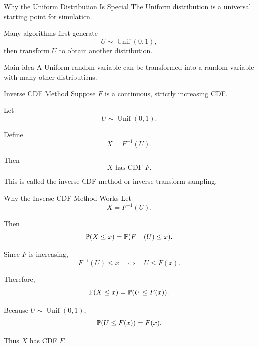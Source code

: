 
\begin{frame}{Why the Uniform Distribution Is Special}
The Uniform distribution is a universal starting point for simulation.

\vspace{0.25cm}

Many algorithms first generate
\[
U\sim \operatorname{Unif}(0,1),
\]
then transform $U$ to obtain another distribution.

\vspace{0.25cm}

\begin{keybox}{Main idea}
A Uniform random variable can be transformed into a random variable with many other distributions.
\end{keybox}
\end{frame}

\begin{frame}{Inverse CDF Method}
Suppose $F$ is a continuous, strictly increasing CDF.

Let
\[
U\sim \operatorname{Unif}(0,1).
\]

Define
\[
X=F^{-1}(U).
\]

Then
\[
{
X \text{ has CDF } F.
}
\]

\vspace{0.25cm}

This is called the inverse CDF method or inverse transform sampling.
\end{frame}

\begin{frame}{Why the Inverse CDF Method Works}
Let
\[
X=F^{-1}(U).
\]

Then
\[
\mathbb{P}(X\leq x)
=
\mathbb{P}(F^{-1}(U)\leq x).
\]

Since $F$ is increasing,
\[
F^{-1}(U)\leq x
\quad \Longleftrightarrow \quad
U\leq F(x).
\]

Therefore,
\[
\mathbb{P}(X\leq x)
=
\mathbb{P}(U\leq F(x)).
\]

Because $U\sim\operatorname{Unif}(0,1)$,
\[
\mathbb{P}(U\leq F(x))=F(x).
\]

Thus $X$ has CDF $F$.
\end{frame}

